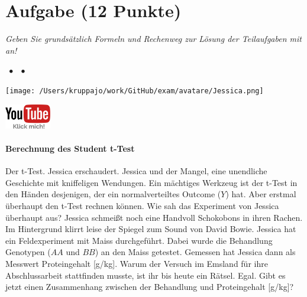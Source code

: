 \documentclass[a4paper, 9pt]{scrartcl}\usepackage[]{graphicx}\usepackage[]{xcolor}
\begin{document}
\section{Aufgabe \hfill (12 Punkte)}

\textit{Geben Sie grundsätzlich Formeln und Rechenweg zur Lösung der Teilaufgaben mit an!} \\[1Ex]
 

 
\ifcollection
\begin{flushright}
\tiny\vspace{-3Ex}
\textbf{\examinhaltstart}
\exammodulemathstat $\;\bullet$
\exammodulestat $\;\bullet$
\exammodulestatbbv 
\vspace{-4Ex}
\end{flushright}
\begin{minipage}[t]{0.5\textwidth}
\texttt{[image: /Users/kruppajo/work/GitHub/exam/avatare/Jessica.png]}
\end{minipage}
\begin{minipage}[t]{0.5\textwidth}
\hfill
\href{https://youtu.be/eGoLNgE-WCo}{\includegraphics[width = 2cm]{img/youtube}}
\end{minipage}
\vspace{-3ex}
\fi



\ifcollection
\paragraph{Berechnung des Student t-Test}
\fi

Der t-Test. Jessica erschaudert. Jessica und der Mangel, eine unendliche Geschichte mit kniffeligen Wendungen. Ein mächtiges Werkzeug ist der t-Test in den Händen desjenigen, der ein normalverteiltes Outcome ($Y$) hat. Aber erstmal überhaupt den t-Test rechnen können. Wie sah das Experiment von Jessica überhaupt aus? Jessica schmeißt noch eine Handvoll Schokobons in ihren Rachen. Im Hintergrund klirrt leise der Spiegel zum Sound von David Bowie. Jessica hat ein Feldexperiment mit Maiss durchgeführt. Dabei wurde die Behandlung Genotypen ($AA$ und $BB$) an den Maiss getestet. Gemessen hat Jessica dann als Messwert Proteingehalt [g/kg]. Warum der Versuch im Emsland für ihre Abschlussarbeit stattfinden musste, ist ihr bis heute ein Rätsel. Egal. Gibt es jetzt einen Zusammenhang zwischen der Behandlung und Proteingehalt [g/kg]?
\end{document}

